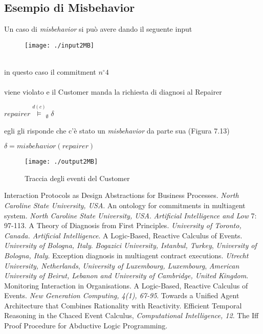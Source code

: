 \documentclass[a4paper,12pt]{report}
\begin{document}
\subsection{Esempio di Misbehavior}
Un caso di \textit{misbehavior} si può avere dando il seguente input
\begin{figure}[h]
    \texttt{[image: ./input2MB]}
\end{figure}
\\in questo caso il commitment $n^{\circ}4$\\
\\
viene violato e il Customer manda la richiesta di diagnosi al Repairer
\begin{center}
    \textit{$repairer\stackrel{d(c)}{\models}_{\emptyset}\delta$}
\end{center}
egli gli risponde che c'è stato un \textit{misbehavior} da parte sua (Figura 7.13)
\begin{center}
    \textit{$\delta=misbehavior(repairer)$}
\end{center}
\begin{figure}[h]
    \texttt{[image: ./output2MB]}
    \caption{Traccia degli eventi del Customer}
\end{figure}
\newpage
\small
{}
\begin{thebibliography}{20}
     Interaction Protocols as Design Abstractions for Business Processes. \textit{North Caroline State University, USA}.
     An ontology for commitments in multiagent system. \textit{North Caroline State University, USA}. \textit{Artificial Intelligence and Low} 7: 97-113.
     A Theory of Diagnosis from First Principles. \textit{University of Toronto, Canada. Artificial Intelligence}.
     A Logic-Based, Reactive Calculus of Events. \textit{University of Bologna, Italy}.
     \textit{Bogazici University, Istanbul, Turkey}, \textit{University of Bologna, Italy}. Exception diagnosis in multiagent contract executions.
     \textit{Utrecht University, Netherlands}, \textit{University of Luxembourg, Luxembourg}, \textit{American University of Beirut, Lebanon and University of Cambridge, United Kingdom}. Monitoring Interaction in Organisations.
     A Logic-Based, Reactive Calculus of Events. \textit{New Generation Computing, 4(1), 67-95}.
     Towards a Unified Agent Architecture that Combines Rationality with Reactivity.
      Efficient Temporal Reasoning in the Chaced Event Calculus, \textit{Computational Intelligence, 12}.
     The Iff Proof Procedure for Abductive Logic Programming.
\end{thebibliography}
\end{document}

